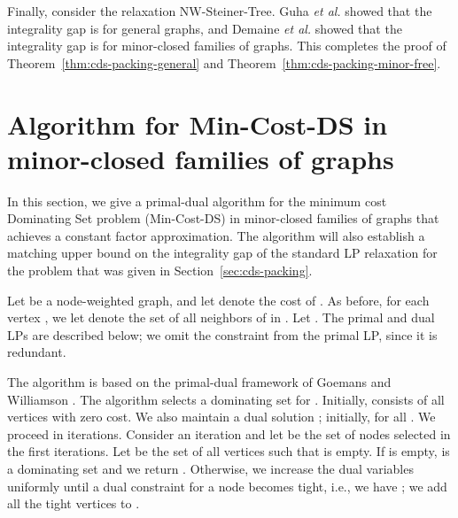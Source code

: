 \documentclass[11pt]{article}
\def\etal{\emph{et al.}\xspace}
\def\prob#1{\textsf{\textup{#1}}\xspace}
\def\nwST{\prob{NW-Steiner-Tree}}
\def\minDS{\prob{Min-Cost-DS}}
\begin{document}
\noindent
Finally, consider the relaxation \nwST. Guha \etal \cite{GuhaMNS99}
showed that the integrality gap is  for general graphs,
and Demaine \etal \cite{DemaineHK09} showed that the integrality gap
is  for minor-closed families of graphs.  This completes the
proof of Theorem~\ref{thm:cds-packing-general} and
Theorem~\ref{thm:cds-packing-minor-free}.

\section{Algorithm for \minDS in minor-closed families of graphs}
\label{sec:min-cost-ds-planar}

In this section, we give a primal-dual algorithm for the minimum cost
\prob{Dominating Set} problem (\minDS) in minor-closed families of
graphs that achieves a constant factor approximation. The algorithm
will also establish a matching upper bound on the integrality gap of
the standard LP relaxation for the problem that was given in
Section~\ref{sec:cds-packing}.

Let  be a node-weighted graph, and let  denote
the cost of . As before, for each vertex , we let 
denote the set of all neighbors of  in . Let . The primal and dual LPs are described below;
we omit the constraint  from the primal LP, since it is
redundant.

\begin{center}
\begin{boxedminipage}{0.45\textwidth}
\vspace{-0.15in}

\end{boxedminipage}
\vspace{0.1in}
\begin{boxedminipage}{0.45\textwidth}
\vspace{-0.15in}

\end{boxedminipage}
\end{center}

\noindent
The algorithm is based on the primal-dual framework of Goemans and
Williamson \cite{GoemansW95}. The algorithm selects a dominating set
 for . Initially,  consists of all vertices with zero cost.
We also maintain a dual solution ; initially,  for all
. We proceed in iterations. Consider an iteration  and
let  be the set of nodes selected in the first 
iterations.  Let  be the set of all vertices  such that
 is empty. If  is empty, 
is a dominating set and we return .  Otherwise, we
increase the dual variables  uniformly
until a dual constraint for a node  becomes tight, i.e., we have
; we add all the tight
vertices to .
\end{document}
